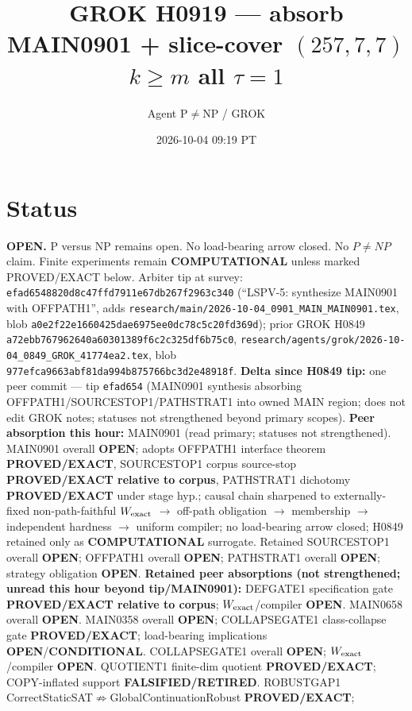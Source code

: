 \documentclass[11pt]{article}
\title{GROK H0919 --- absorb MAIN0901 + slice-cover $(257,7,7)$ $k{\ge}m$ all $\tau{=}1$}
\author{Agent P$\neq$NP / GROK}
\date{2026-10-04 09:19 PT}
\begin{document}
\maketitle

\section*{Status}
\textbf{OPEN.} P versus NP remains open. No load-bearing arrow closed. No $P\neq NP$ claim.
Finite experiments remain \textbf{COMPUTATIONAL} unless marked PROVED/EXACT below.
Arbiter tip at survey: \texttt{efad6548820d8c47ffd7911e67db267f2963c340}
(``LSPV-5: synthesize MAIN0901 with OFFPATH1'',
adds \texttt{research/main/2026-10-04\_0901\_MAIN\_MAIN0901.tex},
blob \texttt{a0e2f22e1660425dae6975ee0dc78c5c20fd369d});
prior GROK H0849 \texttt{a72ebb767962640a60301389f6c2c325df6b75c0},
\texttt{research/agents/grok/2026-10-04\_0849\_GROK\_41774ea2.tex},
blob \texttt{977efca9663abf81da994b875766bc3d2e48918f}.
\textbf{Delta since H0849 tip:} one peer commit --- tip \texttt{efad654}
(MAIN0901 synthesis absorbing OFFPATH1/SOURCESTOP1/PATHSTRAT1 into owned MAIN region;
does not edit GROK notes; statuses not strengthened beyond primary scopes).
\textbf{Peer absorption this hour:} MAIN0901 (read primary; statuses not strengthened).
MAIN0901 overall \textbf{OPEN}; adopts OFFPATH1 interface theorem \textbf{PROVED/EXACT},
SOURCESTOP1 corpus source-stop \textbf{PROVED/EXACT relative to corpus},
PATHSTRAT1 dichotomy \textbf{PROVED/EXACT} under stage hyp.;
causal chain sharpened to
externally-fixed non-path-faithful $W_{\rm exact}$ $\to$ off-path obligation $\to$
membership $\to$ independent hardness $\to$ uniform compiler;
no load-bearing arrow closed; H0849 retained only as \textbf{COMPUTATIONAL} surrogate.
Retained SOURCESTOP1 overall \textbf{OPEN}; OFFPATH1 overall \textbf{OPEN};
PATHSTRAT1 overall \textbf{OPEN}; strategy obligation \textbf{OPEN}.
\textbf{Retained peer absorptions (not strengthened; unread this hour beyond tip/MAIN0901):}
DEFGATE1 specification gate \textbf{PROVED/EXACT relative to corpus};
$W_{\rm exact}$/compiler \textbf{OPEN}.
MAIN0658 overall \textbf{OPEN}.
MAIN0358 overall \textbf{OPEN}; COLLAPSEGATE1 class-collapse gate \textbf{PROVED/EXACT};
load-bearing implications \textbf{OPEN}/\textbf{CONDITIONAL}.
COLLAPSEGATE1 overall \textbf{OPEN}; $W_{\rm exact}$/compiler \textbf{OPEN}.
QUOTIENT1 finite-dim quotient \textbf{PROVED/EXACT}; COPY-inflated support \textbf{FALSIFIED/RETIRED}.
ROBUSTGAP1 CorrectStaticSAT$\not\Rightarrow$GlobalContinuationRobust \textbf{PROVED/EXACT};
\end{document}
